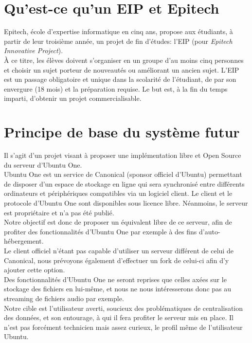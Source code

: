\documentclass[12pt]{report}
\begin{document}
\section{Qu'est-ce qu'un EIP et Epitech}
Epitech, école d'expertise informatique en cinq ans, propose aux étudiants, à partir de leur troisième année, un projet de fin d'études: l'EIP (pour \emph{Epitech Innovative Project}).\\

À ce titre, les élèves doivent s'organiser en un groupe d'au moins cinq personnes et choisir un sujet porteur de nouveautés ou améliorant un ancien sujet. L'EIP est un passage obligatoire et unique dans la scolarité de l'étudiant, de par son envergure (18 mois) et la préparation requise. Le but est, à la fin du temps imparti, d'obtenir un projet commercialisable.


\section{Principe de base du système futur}
    Il s’agit d’un projet visant à proposer une implémentation libre et Open Source du serveur d’Ubuntu One.\\

    Ubuntu One est un service de Canonical (sponsor officiel d'Ubuntu) permettant de disposer d’un espace de stockage en ligne qui sera synchronisé entre différents ordinateurs et périphériques compatibles via un logiciel client. Le client et le protocole d’Ubuntu One sont disponibles sous licence libre. Néanmoins, le serveur est propriétaire et n’a pas été publié.\\


    Notre objectif est donc de proposer un équivalent libre de ce serveur, afin
    de profiter des fonctionnalités d’Ubuntu One par exemple à des fins d’auto-hébergement.\\

    Le client officiel n’étant pas capable d’utiliser un serveur différent de celui
    de Canonical, nous prévoyons également d'effectuer un fork de celui-ci afin d'y ajouter cette option.\\

    Des fonctionnalités d'Ubuntu One ne seront reprises que celles axées sur le stockage des fichiers en lui-même, et nous ne nous intéresserons donc pas au streaming de fichiers audio par exemple.\\

    Notre cible est l'utilisateur averti, soucieux des problématiques de centralisation des données, et son entourage, à qui il fera profiter le serveur mis en place. Il n'est pas forcément technicien mais assez curieux, le profil même de l'utilisateur Ubuntu.
\end{document}
